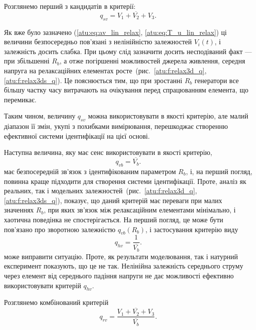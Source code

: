 Розглянемо перший з кандидатів в критерії:
\begin{equation}
  q_{sv} = \overline{V_1+V_2+V_3} .
  \label{atu:eq:q_sv_relax}
\end{equation}


Як вже було зазначено (\ref{atu:eq:av_lin_relax}, \ref{atu:eq:T_u_lin_relax}) ці величини
безпосередньо пов'язані з нелінійністю залежностей
$V_i (t) $, і залежність досить слабка. При цьому слід зазначити
досить несподіваний факт --- при збільшенні
$R_b $, а отже погіршенні можливостей джерела живлення, середня
напруга на релаксаційних елементах росте~(рис.~\ref{atu:f:relax3d_q},
\ref{atu:f:relax3ds_q}). Це пояснюється тим, що при зростанні
$R_b $ генератори все більшу частку часу витрачають на очікування
перед спрацюванням  елемента, що перемикає.

Таким чином, величину
$q_{sv}$ можна використовувати в якості критерію, але малий
діапазон її змін, укупі з похибками вимірювання, перешкоджає
створенню ефективної системи ідентифікації на цієї основі.


Наступна величина, яку має сенс використовувати в якості
критерію,
%
\begin{equation}
  q_{vb} = \overline{V_b} .
  \label{atu:eq:q_vb_relax}
\end{equation}
%
має безпосередній зв'язок з ідентифікованим параметром
$R_b $, і, на перший погляд, повинна краще підходити для створення
системи ідентифікації. Проте, аналіз як реальних, так і модельних
залежностей~(рис.~\ref{atu:f:relax3d_q}, \ref{atu:f:relax3ds_q}), показує, що даний
критерій має переваги при малих значеннях
$R_b $, при яких зв'язок між релаксаційним елементами мінімально, і
хаотична поведінка не спостерігається. На перший погляд,
це може бути пов'язано про зворотною залежністю
$q_{vb} (R_b) $, і застосування критерію виду
%
\begin{equation}
  q_{hv} = \frac{1}{\overline{V_b}} .
  \label{atu:eq:q_hb_relax}
\end{equation}
%
може виправити ситуацію. Проте, як результати моделювання,
так і натурний експеримент показують, що це не так. Нелінійна
залежність середнього струму через елемент від середнього
падіння напруги не дає можливості ефективно використовувати критерій
$q_{hv}$.

Розглянемо комбінований критерій
%
\begin{equation}
  q_{rv} = \frac{\overline{V_1+V_2+V_3}}{\overline{V_b}}.
  \label{atu:eq:q_rv_relax}
\end{equation}


